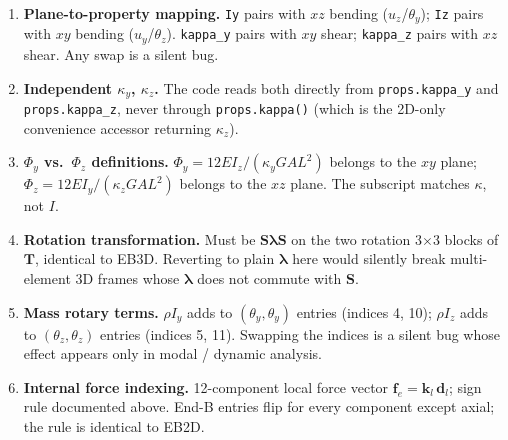 \documentclass[11pt,a4paper]{article}
\newcommand{\bmath}[1]{\boldsymbol{#1}}
\newcommand{\Sdiag}{\bmath{S}}
\newcommand{\lam}{\bmath{\lambda}}
\begin{document}
\begin{enumerate}
    \item \textbf{Plane-to-property mapping.} \texttt{Iy} pairs with $xz$ bending ($u_z$/$\theta_y$); \texttt{Iz} pairs with $xy$ bending ($u_y$/$\theta_z$). \texttt{kappa\_y} pairs with $xy$ shear; \texttt{kappa\_z} pairs with $xz$ shear. Any swap is a silent bug.
    \item \textbf{Independent $\kappa_y$, $\kappa_z$.} The code reads both directly from \texttt{props.kappa\_y} and \texttt{props.kappa\_z}, never through \texttt{props.kappa()} (which is the 2D-only convenience accessor returning $\kappa_z$).
    \item \textbf{$\Phi_y$ vs.\ $\Phi_z$ definitions.} $\Phi_y = 12 EI_z/(\kappa_y GA L^2)$ belongs to the $xy$ plane; $\Phi_z = 12 EI_y/(\kappa_z GA L^2)$ belongs to the $xz$ plane. The subscript matches $\kappa$, not $I$.
    \item \textbf{Rotation transformation.} Must be $\Sdiag\lam\Sdiag$ on the two rotation 3$\times$3 blocks of $\bmath{T}$, identical to EB3D. Reverting to plain $\lam$ here would silently break multi-element 3D frames whose $\lam$ does not commute with $\Sdiag$.
    \item \textbf{Mass rotary terms.} $\rho I_y$ adds to $(\theta_y, \theta_y)$ entries (indices 4, 10); $\rho I_z$ adds to $(\theta_z, \theta_z)$ entries (indices 5, 11). Swapping the indices is a silent bug whose effect appears only in modal / dynamic analysis.
    \item \textbf{Internal force indexing.} 12-component local force vector $\bmath{f}_e = \bmath{k}_l\,\bmath{d}_l$; sign rule documented above. End-B entries flip for every component except axial; the rule is identical to EB2D.
\end{enumerate}
\end{document}
